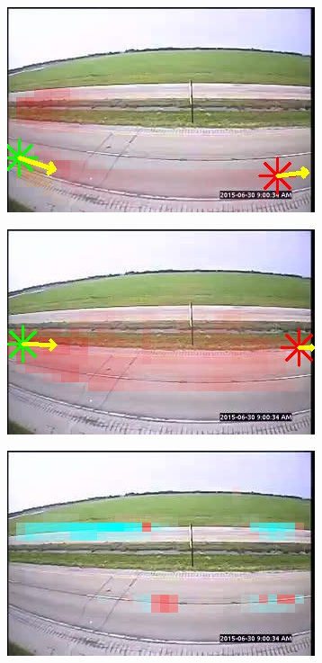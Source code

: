 \begin{figure}
\begin{subfigure}{0.32\linewidth}
            \includegraphics[width=\linewidth]{./img/scene_learning/res/245837/245837-2.jpg}
        \end{subfigure}
        \begin{subfigure}{0.32\linewidth}
            \includegraphics[width=\linewidth]{./img/scene_learning/res/245837/245837-3.jpg}
        \end{subfigure}
        \begin{subfigure}{0.32\linewidth}
            \includegraphics[width=\linewidth]{./img/scene_learning/res/245837/245837-4.jpg}

\end{subfigure}
\end{figure}
